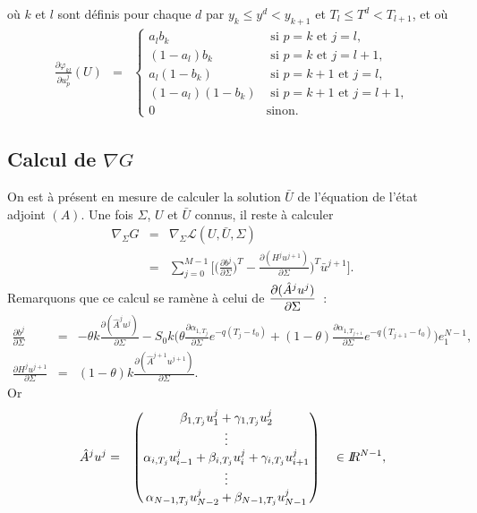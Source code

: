 o\`u $k$ et $l$ sont d\'efinis pour chaque $d$ par 
$y_k\leq y^d < y_{k+1}$ et $T_l\leq T^d < T_{l+1}$, et o\`u
\begin{eqnarray*}
\frac{\partial \varphi_{kl}}{\partial u^j_p}(U) &=& 
\begin{cases}
a_lb_k & \text{ si } p=k \text{ et } j=l,\\
(1-a_l)b_k & \text{ si } p=k \text{ et } j=l+1,\\
a_l(1-b_k) & \text{ si } p=k+1 \text{ et } j=l,\\
(1-a_l)(1-b_k) & \text{ si } p=k+1 \text{ et } j=l+1,\\
0 & \text{sinon}.
\end{cases}
\end{eqnarray*}

\subsection*{Calcul de $\nabla G$}
On est \`a pr\'esent en mesure de calculer la solution $\bar{U}$ 
de l'\'equation de l'\'etat adjoint $(A)$. Une fois $\Sigma$, $U$ 
et $\bar{U}$ connus, il reste \`a calculer 
\begin{eqnarray}
\nabla_{\Sigma}G  &=& \nabla_{\Sigma} 
\mathcal{L}(U,\bar{U},\Sigma)\\
&=& \sum_{j=0}^{M-1}\biggl[\biggl(\frac{\partial b^j}
{\partial \Sigma}\biggr)^T - \frac{\partial (H^ju^{j+1})}
{\partial \Sigma}\biggr)^T\bar{u}^{j+1}\biggr]. 
\label{deriv_G_Sigma}
\end{eqnarray}
Remarquons que ce calcul se ram\`ene \`a celui de 
${\displaystyle\frac{\partial (\hat{A}^ju^{j})}{\partial \Sigma}}$~:
\begin{eqnarray}
\frac{\partial b^j}{\partial \Sigma} &=& -\theta k 
\frac{\partial (\hat{A}^ju^j)}{\partial \Sigma} -S_0k
\biggl(\theta \frac{\partial \alpha_{1,T_j}}{\partial \Sigma}
e^{-q(T_j-t_0)}+(1-\theta)\frac{\partial \alpha_{1,T_{j+1}}}
{\partial \Sigma}e^{-q(T_{j+1}-t_0)}\biggr)e_1^{N-1},
\label{deriv_bj_Sigma}\\
\frac{\partial H^ju^{j+1}}{\partial \Sigma} &=& 
(1-\theta)k\frac{\partial (\hat{A}^{j+1}u^{j+1})}
{\partial \Sigma}. \label{deriv_Hu_Sigma}
\end{eqnarray}
Or 
\begin{eqnarray*}
\hat{A}^ju^j &=& \begin{pmatrix}
\beta_{1,T_j}u_1^j + \gamma_{1,T_j}u_2^j \\
\vdots \\
\alpha_{i,T_j}u_{i-1}^j + \beta_{i,T_j}u_i^j + 
\gamma_{i,T_j}u_{i+1}^j \\
\vdots \\
\alpha_{N-1,T_j}u_{N-2}^j + \beta_{N-1,T_j}u_{N-1}^j 
\end{pmatrix}
\quad \in I\!\! R^{N-1},
\end{eqnarray*}
